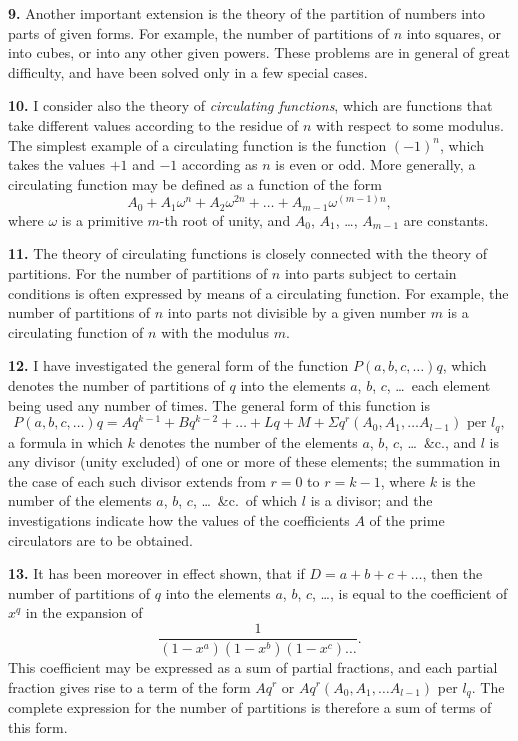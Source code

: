 \documentclass[11pt,a4paper]{book}
\begin{document}
\textbf{9.} Another important extension is the theory of the partition of numbers into parts of given forms. For example, the number of partitions of $n$ into squares, or into cubes, or into any other given powers. These problems are in general of great difficulty, and have been solved only in a few special cases.

\textbf{10.} I consider also the theory of \textit{circulating functions}, which are functions that take different values according to the residue of $n$ with respect to some modulus. The simplest example of a circulating function is the function $(-1)^n$, which takes the values $+1$ and $-1$ according as $n$ is even or odd. More generally, a circulating function may be defined as a function of the form
\[
A_0 + A_1 \omega^n + A_2 \omega^{2n} + \ldots + A_{m-1} \omega^{(m-1)n},
\]
where $\omega$ is a primitive $m$-th root of unity, and $A_0$, $A_1$, \ldots, $A_{m-1}$ are constants.

\newpage
\setcounter{page}{238}

\textbf{11.} The theory of circulating functions is closely connected with the theory of partitions. For the number of partitions of $n$ into parts subject to certain conditions is often expressed by means of a circulating function. For example, the number of partitions of $n$ into parts not divisible by a given number $m$ is a circulating function of $n$ with the modulus $m$.

\textbf{12.} I have investigated the general form of the function $P(a, b, c, \ldots)q$, which denotes the number of partitions of $q$ into the elements $a$, $b$, $c$, \ldots\ each element being used any number of times. The general form of this function is
\[
P(a, b, c, \ldots)q = Aq^{k-1} + Bq^{k-2} + \ldots + Lq + M + \Sigma q^r (A_0, A_1, \ldots A_{l-1}) \text{ per } l_q,
\]
a formula in which $k$ denotes the number of the elements $a$, $b$, $c$, \ldots\ \&c., and $l$ is any divisor (unity excluded) of one or more of these elements; the summation in the case of each such divisor extends from $r = 0$ to $r = k-1$, where $k$ is the number of the elements $a$, $b$, $c$, \ldots\ \&c.\ of which $l$ is a divisor; and the investigations indicate how the values of the coefficients $A$ of the prime circulators are to be obtained.

\newpage
\setcounter{page}{239}

\textbf{13.} It has been moreover in effect shown, that if $D = a + b + c + \ldots$, then the number of partitions of $q$ into the elements $a$, $b$, $c$, \ldots, is equal to the coefficient of $x^q$ in the expansion of
\[
\frac{1}{(1-x^a)(1-x^b)(1-x^c)\ldots}.
\]
This coefficient may be expressed as a sum of partial fractions, and each partial fraction gives rise to a term of the form $Aq^r$ or $Aq^r(A_0, A_1, \ldots A_{l-1})$ per $l_q$. The complete expression for the number of partitions is therefore a sum of terms of this form.
\end{document}

